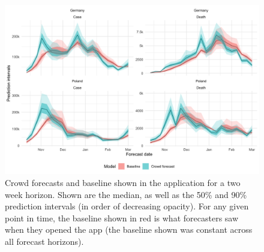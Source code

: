 \documentclass[10pt,letterpaper]{article}
\begin{document}
\begin{figure}[H]
\includegraphics[width=1\linewidth,]{../analysis/plots/comparison-forecast-interals} \caption{Crowd forecasts and baseline shown in the application for a two week horizon. Shown are the median, as well as the 50\% and 90\% prediction intervals (in order of decreasing opacity). For any given point in time, the baseline shown in red is what forecasters saw when they opened the app (the baseline shown was constant across all forecast horizons).}\label{fig:compare-forecasters}
\end{figure}
\end{document}

